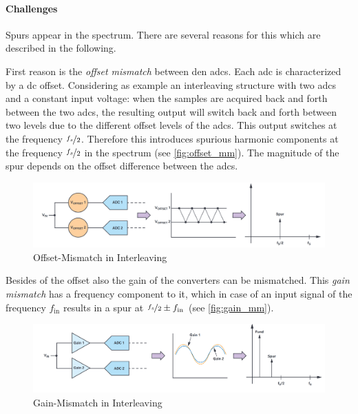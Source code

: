 \paragraph{Challenges}
Spurs appear in the spectrum. There are several reasons for this which are described in the following.

First reason is the \textit{offset mismatch} between den \glspl{adc}. 
Each \gls{adc} is characterized by a \gls{dc} offset. Considering as example an interleaving structure with two \glspl{adc} and a constant input voltage: when the samples are acquired back and forth between the two \glspl{adc}, the resulting output will switch back and forth between two levels due to the different offset levels of the \glspl{adc}. 
This output switches at the frequency $\nicefrac{f_s}{2}$. Therefore this introduces spurious harmonic components at the frequency $\nicefrac{f_s}{2}$ in the spectrum (see \autoref{fig:offset_mm}). 
The magnitude of the spur depends on the offset difference between the \glspl{adc}. \cite{Harris2019}

\begin{figure}[tbh]
	\centering
	\includegraphics[width = \textwidth]{chap/02-theory/img/offset_mm}
	\caption{Offset-Mismatch in Interleaving \cite{Harris2019}}
	\label{fig:offset_mm}
\end{figure}

Besides of the offset also the gain of the converters can be mismatched. 
This \textit{gain mismatch} has a frequency component to it, which in case of an input signal of the frequency $f_{\text{in}}$ results in a spur at $\nicefrac{f_s}{2} \pm f_{\text{in}}$ (see \autoref{fig:gain_mm}). \cite{Harris2019}

\begin{figure}[tbh]
	\centering
	\includegraphics[width = \textwidth]{chap/02-theory/img/gain_mm}
	\caption{Gain-Mismatch in Interleaving \cite{Harris2019}}
	\label{fig:gain_mm}
\end{figure}

